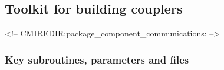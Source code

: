 \subsection{Toolkit for building couplers}
\label{sec:component_communications}
\label{sec:pkg:component_communications}
\begin{rawhtml}
<!-- CMIREDIR:package_component_communications: -->
\end{rawhtml}

\subsubsection{Key subroutines, parameters and files}
\label{sec:pkg:component_communications:implementation_synopsis}
